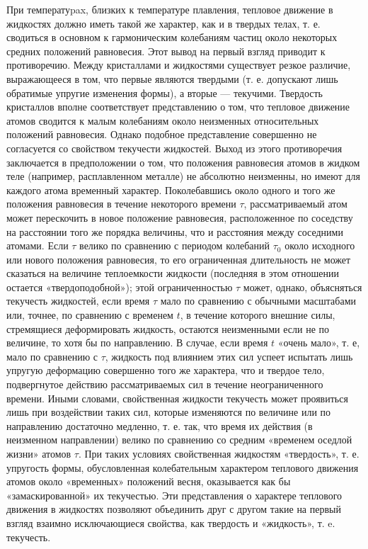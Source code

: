 \documentclass[a4paper, 12pt]{article}
\begin{document}
При температуpax, близких к температуре плавления, тепловое движение в жидкостях
должно иметь такой же характер, как и в твердых телах, т. е. сводиться в основном 
к гармоническим колебаниям частиц около некоторых средних положений равновесия.
Этот вывод на первый взгляд приводит к противоречию. Между кристаллами и
жидкостями существует резкое различие, выражающееся
в том, что первые являются твердыми (т. е. допускают лишь обратимые упругие изменения формы), 
а вторые — текучими. Твердость кристаллов вполне 
соответствует представлению о том, что тепловое движение атомов сводится к малым колебаниям около 
неизменных относительных положений равновесия.
 Однако подобное представление совершенно не согласуется со свойством текучести жидкостей.
Выход из этого противоречия заключается в предположении о том, что положения равновесия
 атомов в жидком теле (например, расплавленном металле)
 не абсолютно неизменны, но имеют для каждого атома временный характер. Поколебавшись около 
 одного и того же положения
равновесия в течение некоторого времени $\tau$, рассматриваемый атом может перескочить в новое
 положение равновесия, расположенное
 по соседству на расстоянии того же порядка величины, что и расстояния между соседними атомами.
Если $\tau$ велико по сравнению с периодом колебаний $\tau_{0}$ около исходного или нового положения равновесия,
 то его ограниченная длительность
не может сказаться на величине теплоемкости жидкости (последняя в этом отношении остается «твердоподобной»);
 этой ограниченностью $\tau$ может, 
однако, объясняться текучесть жидкостей, если время $\tau$ мало по сравнению с обычными масштабами или, точнее, 
по сравнению с временем $t$, в течение
 которого внешние силы, стремящиеся деформировать жидкость, остаются неизменными если не по величине,
  то хотя бы по направлению.
В случае, если время $t$ «очень мало», т. е, мало по сравнению с $\tau$, жидкость под влиянием этих сил успеет 
испытать лишь упругую деформацию совершенно того же характера, что и твердое тело, подвергнутое действию 
рассматриваемых сил в течение неограниченного времени.
Иными словами, свойственная жидкости текучесть может проявиться лишь при воздействии таких сил, которые изменяются 
по величине или по направлению достаточно медленно, т. е. так, что время их действия (в неизменном направлении)
 велико по сравнению со средним «временем оседлой жизни» атомов $\tau$. При таких условиях свойственная жидкостям «твердость», 
т. е. упругость формы, обусловленная колебательным характером 
теплового движения атомов около «временных» положений весня, оказывается как бы «замаскированной» их текучестью.
Эти представления о характере теплового движения в жидкостях позволяют объединить друг 
с другом такие на первый взгляд взаимно исключающиеся свойства, как твердость и «жидкость», т. e. текучесть.
\end{document}
